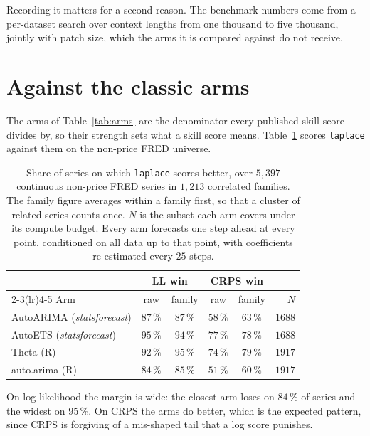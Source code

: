 \documentclass[article]{jss}
\providecommand{\proglang}[1]{\textsf{#1}}
\providecommand{\pkg}[1]{\textit{#1}}
\renewcommand{\pkg}[1]{\textit{#1}}
\providecommand{\code}[1]{\texttt{#1}}
\begin{document}
Recording it matters for a second reason. The \citet{woo2024moirai} benchmark
numbers come from a per-dataset search over context lengths from one thousand to
five thousand, jointly with patch size, which the arms it is compared against do
not receive.

\section{Against the classic arms}\label{sec:classic}

The arms of Table~\ref{tab:arms} are the denominator every published skill
score divides by, so their strength sets what a skill score means.
Table~\ref{tab:classic} scores \code{laplace} against them on the non-price
\proglang{FRED} universe.

\begin{table}[t!]
\centering
\begin{tabular}{lccccr}
\toprule
 & \multicolumn{2}{c}{LL win} & \multicolumn{2}{c}{CRPS win} & \\
\cmidrule(lr){2-3}\cmidrule(lr){4-5}
Arm & raw & family & raw & family & $N$ \\
\midrule
AutoARIMA (\pkg{statsforecast}) & $87\,\%$ & $87\,\%$ & $58\,\%$ & $63\,\%$ & $1688$ \\
AutoETS (\pkg{statsforecast})   & $95\,\%$ & $94\,\%$ & $77\,\%$ & $78\,\%$ & $1688$ \\
Theta (\proglang{R})            & $92\,\%$ & $95\,\%$ & $74\,\%$ & $79\,\%$ & $1917$ \\
auto.arima (\proglang{R})       & $84\,\%$ & $85\,\%$ & $51\,\%$ & $60\,\%$ & $1917$ \\
\bottomrule
\end{tabular}
\caption{Share of series on which \code{laplace} scores better, over $5{,}397$
continuous non-price \proglang{FRED} series in $1{,}213$ correlated families.
The family figure averages within a family first, so that a cluster of related
series counts once. $N$ is the subset each arm covers under its compute budget.
Every arm forecasts one step ahead at every point, conditioned on all data up to
that point, with coefficients re-estimated every $25$ steps.}
\label{tab:classic}
\end{table}

On log-likelihood the margin is wide: the closest arm loses on $84\,\%$ of
series and the widest on $95\,\%$. On CRPS the arms do better, which is the
expected pattern, since CRPS is forgiving of a mis-shaped tail that a log score
punishes.
\end{document}

